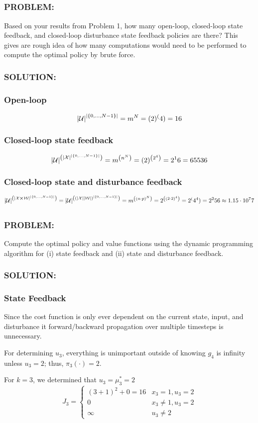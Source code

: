 \documentclass[]{article}
\newcommand{\Problem}{\subsubsection*{\textbf{PROBLEM:}}}
\newcommand{\Solution}{\subsubsection*{\textbf{SOLUTION:}}}
\begin{document}
\subsection{}
\Problem
Based on your results from Problem 1, how many open-loop, closed-loop state feedback, and closed-loop disturbance state feedback policies are there? 
This gives are rough idea of how many computations would need to be performed to compute the optimal policy by brute force.
\Solution
\subsubsection{Open-loop}
\[
    \abs{\mathcal{U}}^\abs{\{0,\dots, N-1\}} = m^N = (2)^(4) = 16
\]
\subsubsection{Closed-loop state feedback}
\[
    \abs{\mathcal{U}}^\qty(\abs{\mathcal{X}}^\abs{\{0,\dots,N-1\}}) = m^\qty(n^N) = (2)^\qty(2^4) = 2^16 = 65536
\]
\subsubsection{Closed-loop state and disturbance feedback}
\[
    \abs{\mathcal{U}}^\qty(\abs{\mathcal{X} \cross \mathcal{W}}^\abs{\{0,\dots,N-1\}})
    = \abs{\mathcal{U}}^\qty(\qty(\abs{\mathcal{X}} \abs{\mathcal{W}})^\abs{\{0,\dots,N-1\}})
    = m^\qty((n\cdot p)^N)
    = 2^\qty((2 \cdot 2)^4)
    = 2^(4^4)
    = 2^256
    \approx 1.15 \cdot 10^77
\]

\subsection{}
\Problem
Compute the optimal policy and value functions using the dynamic programming algorithm for (i) state feedback and (ii) state and disturbance feedback.

\Solution
\subsubsection{State Feedback}
Since the cost function is only ever dependent on the current state, input, and disturbance it forward/backward propagation over multiple timesteps is unnecessary.

For determining $u_3$, everything is unimportant outside of knowing $g_4$ is infinity unless $u_3 = 2$; thus, $\pi_3(\cdot) = 2$.

For $k=3$, we determined that $u_3 = \mu_3^* = 2$ \[
    J_3 = \begin{cases}
        (3+1)^2 + 0=16& x_3=1, u_3 = 2\\
        0 &x_3 \neq 1, u_3 = 2\\
        \infty & u_3 \neq 2
    \end{cases}
\]
\end{document}

